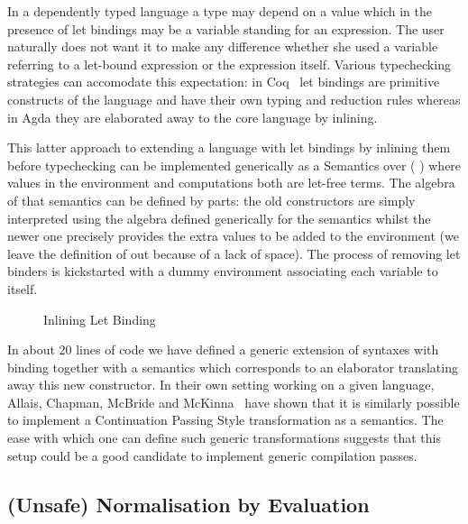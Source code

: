 In a dependently typed language a type may depend on a value which
in the presence of let bindings may be a variable standing for an
expression. The user naturally does not want it to make any difference
whether she used a variable referring to a let-bound expression or
the expression itself. Various typechecking strategies can accomodate
this expectation: in Coq~\cite{Coq:manual} let bindings are primitive
constructs of the language and have their own typing and reduction
rules whereas in Agda they are elaborated away to the core language
by inlining.

This latter approach to extending a language  with let bindings
by inlining them before typechecking can be implemented generically as
a Semantics over (  ) where values in the environment and
computations both are let-free terms. The algebra of that semantics can
be defined by parts: the old constructors are simply interpreted using
the algebra defined generically for the  semantics whilst
the newer one precisely provides the extra values to be added to the
environment (we leave the definition of  out because of a lack
of space). The process of removing let binders is kickstarted with a
dummy environment associating each variable to itself.

\begin{figure}[h]
\begin{minipage}{0.45\textwidth}
\end{minipage}\hspace{2em}
\begin{minipage}{0.45\textwidth}
\end{minipage}
\caption{Inlining Let Binding}
\end{figure}

In about 20 lines of code we have defined a generic extension of
syntaxes with binding together with a semantics which corresponds
to an elaborator translating away this new constructor. In their
own setting working on a given language, Allais, Chapman, McBride
and McKinna~\citeyear{allais2017type} have shown that it is similarly
possible to implement a Continuation Passing Style transformation as
a semantics.
The ease with which one can define such generic transformations
suggests that this setup could be a good candidate to implement
generic compilation passes.

\subsection{(Unsafe) Normalisation by Evaluation}

